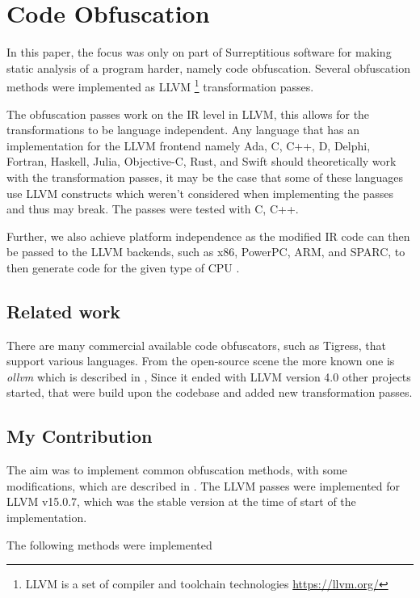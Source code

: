 \section{Code Obfuscation}

In this paper, the focus was only on part of Surreptitious software for making static analysis of a program harder, namely code obfuscation.
Several obfuscation methods were implemented as LLVM \footnote{LLVM is a set of compiler and toolchain technologies \url{https://llvm.org/}}
transformation passes.

The obfuscation passes work on the IR level in LLVM, this allows for the transformations to be language independent.
Any language that has an implementation for the LLVM frontend namely Ada, C, C++, D, Delphi, Fortran, Haskell, Julia, Objective-C, Rust, and Swift
should theoretically work with the transformation passes, it may be the case that some of these languages use LLVM constructs
which weren't considered when implementing the passes and thus may break. The passes were tested with C, C++.

Further, we also achieve platform independence as the modified IR code can then be passed to the LLVM backends, such as x86, PowerPC, ARM, and SPARC,
to then generate code for the given type of CPU \cite{llvm-backend}.

\subsection{Related work}

There are many commercial available code obfuscators, such as Tigress, that support various languages. From the open-source scene
the more known one is \textit{ollvm} which is described in \cite{ollvm}, Since it ended with LLVM version 4.0 other projects started, \cite{Hikari1, Hikari2, YANSOllvm}
that were build upon the codebase and added new transformation passes.

\subsection{My Contribution}

The aim was to implement common obfuscation methods, with some modifications, which are described in \cite{ss-chpt4}.
The LLVM passes were implemented for LLVM v15.0.7, which was the stable version at the time of start of the implementation.

The following methods were implemented

